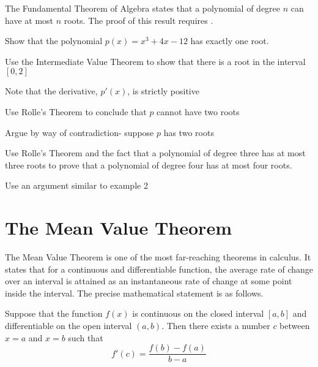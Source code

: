 \documentclass[handout]{ximera}
\begin{document}
\begin{remark} The Fundamental Theorem of Algebra states that a polynomial of degree $n$ can have at most $n$ roots.
	The proof of this result requires .
\end{remark}

\begin{problem}[problem 2a]
  Show that the polynomial $p(x) = x^3 + 4x - 12$ has exactly one root.

  \begin{hint} 
    Use the Intermediate Value Theorem to show that there is a root in the interval $[0,2]$
  \end{hint}
  \begin{hint} 
    Note that the derivative, $p'(x)$, is strictly positive
  \end{hint}
  \begin{hint} 
    Use Rolle's Theorem to conclude that $p$ cannot have two roots
  \end{hint}
  \begin{hint} 
    Argue by way of contradiction- suppose $p$ has two roots 
  \end{hint}

  \end{problem}


\begin{problem}[problem 2b]
Use Rolle's Theorem and the fact that a polynomial of degree three has at most three 
roots to prove that a polynomial of degree four has at most four roots.
\begin{hint} 
	Use an argument similar to example 2
\end{hint}
\end{problem}

\section{The Mean Value Theorem}


The Mean Value Theorem is one of the most far-reaching theorems in calculus. It states that for a continuous 
and differentiable function, the average rate of change over an interval is attained as an 
instantaneous rate of change at some point inside the interval. The precise mathematical statement is as follows.\\

\begin{theorem}
Suppose that the function $f(x)$ is continuous on the closed interval $[a,b]$ and differentiable on the 
open interval $(a,b)$. Then there exists a number $c$ between $x = a$ and $x = b$ such that
\[f'(c) = \frac{f(b) - f(a)}{b-a}\]

\end{theorem}
\end{document}
